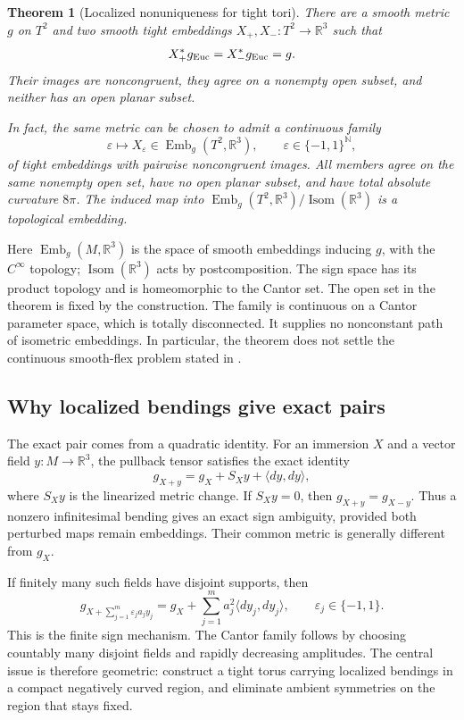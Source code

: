 \documentclass[11pt]{amsart}
\newtheorem{theorem}{Theorem}[section]
\theoremstyle{definition}
\theoremstyle{remark}
\newcommand{\R}{\mathbb R}\newcommand{\Sph}{\mathbb S}
\DeclareMathOperator{\Isom}{Isom}\DeclareMathOperator{\Emb}{Emb}
\numberwithin{equation}{section}
\begin{document}
\begin{theorem}[Localized nonuniqueness for tight tori]\label{thm:main-fiber}
There are a smooth metric $g$ on $T^2$ and two smooth tight embeddings
$X_+,X_-:T^2\to\R^3$ such that
\[
 X_+^*g_{\rm Euc}=X_-^*g_{\rm Euc}=g.
\]
Their images are noncongruent, they agree on a nonempty open subset, and
neither has an open planar subset.

In fact, the same metric can be chosen to admit a continuous family
\[
 \varepsilon\longmapsto X_\varepsilon\in\Emb_g(T^2,\R^3),
 \qquad \varepsilon\in\{-1,1\}^{\mathbb N},
\]
of tight embeddings with pairwise noncongruent images. All members agree
on the same nonempty open set, have no open planar subset, and have total
absolute curvature $8\pi$. The induced map into
$\Emb_g(T^2,\R^3)/\Isom(\R^3)$ is a topological embedding.
\end{theorem}

Here $\Emb_g(M,\R^3)$ is the space of smooth embeddings inducing $g$, with
the $C^\infty$ topology; $\Isom(\R^3)$ acts by postcomposition. The sign
space has its product topology and is homeomorphic to the Cantor set.
The open set in the theorem is fixed by the construction. The family
is continuous on a Cantor parameter space, which is totally disconnected.
It supplies no nonconstant path of isometric embeddings. In particular,
the theorem does not settle the continuous smooth-flex problem stated
in \cite[Problem~1.1]{GhomiProblems}.

\subsection{Why localized bendings give exact pairs}
The exact pair comes from a quadratic identity. For an immersion $X$ and a vector
field $y:M\to\R^3$, the pullback tensor satisfies the exact identity
\begin{equation}\label{eq:intro-quadratic}
 g_{X+y}=g_X+S_Xy+\langle dy,dy\rangle,
\end{equation}
where $S_Xy$ is the linearized metric change. If $S_Xy=0$, then
$g_{X+y}=g_{X-y}$. Thus a nonzero infinitesimal bending gives an exact
sign ambiguity, provided both perturbed maps remain embeddings. Their
common metric is generally different from $g_X$.

If finitely many such fields have disjoint supports, then
\[
 g_{X+\sum_{j=1}^m\varepsilon_j a_jy_j}
 =g_X+\sum_{j=1}^m a_j^2\langle dy_j,dy_j\rangle,
 \qquad \varepsilon_j\in\{-1,1\}.
\]
This is the finite sign mechanism. The Cantor family follows by choosing
countably many disjoint fields and rapidly decreasing amplitudes. The
central issue is therefore geometric: construct a tight torus carrying
localized bendings in a compact negatively curved region, and eliminate
ambient symmetries on the region that stays fixed.
\end{document}
